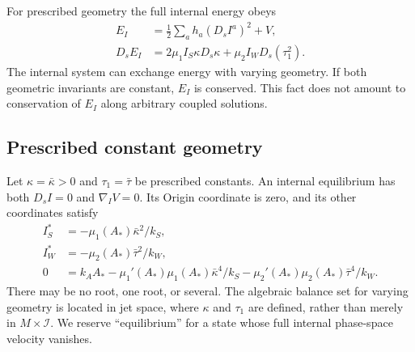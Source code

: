 \documentclass[11pt]{article}
\newcommand{\Ds}{D_s}
\newcommand{\I}{\mathcal I}
\begin{document}
For prescribed geometry the full internal energy obeys
\begin{align}
 E_I&=\tfrac12\sum_a h_a(\Ds I^a)^2+V,\\
 \Ds E_I&=2\mu_1 I_S\kappa\Ds\kappa
             +\mu_2 I_W\Ds(\tau_1^2).
 \label{eq:energy}
\end{align}
The internal system can exchange energy with varying geometry. If both geometric invariants are constant, $E_I$ is conserved. This fact does not amount to conservation of $E_I$ along arbitrary coupled solutions.

\subsection{Prescribed constant geometry}
Let $\kappa=\bar\kappa>0$ and $\tau_1=\bar\tau$ be prescribed constants. An internal equilibrium has both $\Ds I=0$ and $\nabla_I V=0$. Its Origin coordinate is zero, and its other coordinates satisfy
\begin{align}
 I_S^*&=-\mu_1(A_*)\bar\kappa^2/k_S,\label{eq:IstarS}\\
 I_W^*&=-\mu_2(A_*)\bar\tau^2/k_W,\label{eq:IstarW}\\
 0&=k_A A_*-
 \mu_1'(A_*)\mu_1(A_*)\bar\kappa^4/k_S
 -\mu_2'(A_*)\mu_2(A_*)\bar\tau^4/k_W.\label{eq:Astar}
\end{align}
There may be no root, one root, or several. The algebraic balance set for varying geometry is located in jet space, where $\kappa$ and $\tau_1$ are defined, rather than merely in $M\times\I$. We reserve ``equilibrium'' for a state whose full internal phase-space velocity vanishes.
\end{document}
